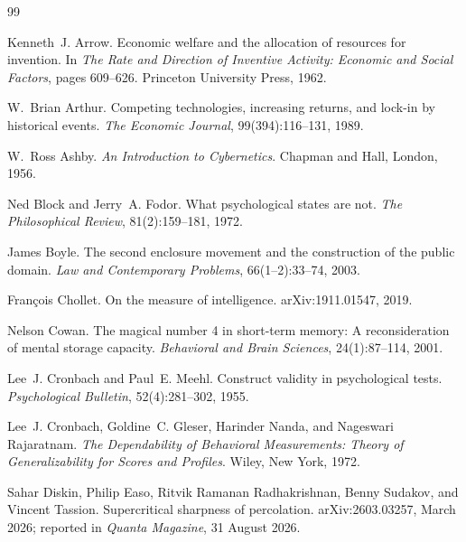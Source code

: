 \documentclass[11pt,a4paper]{article}
\theoremstyle{remark}
\begin{document}
\begin{thebibliography}{99}

Kenneth~J. Arrow.
\newblock Economic welfare and the allocation of resources for invention.
\newblock In \emph{The Rate and Direction of Inventive Activity: Economic and Social Factors}, pages 609--626. Princeton University Press, 1962.

W.~Brian Arthur.
\newblock Competing technologies, increasing returns, and lock-in by historical events.
\newblock \emph{The Economic Journal}, 99(394):116--131, 1989.

W.~Ross Ashby.
\newblock \emph{An Introduction to Cybernetics}.
\newblock Chapman and Hall, London, 1956.

Ned Block and Jerry~A. Fodor.
\newblock What psychological states are not.
\newblock \emph{The Philosophical Review}, 81(2):159--181, 1972.

James Boyle.
\newblock The second enclosure movement and the construction of the public domain.
\newblock \emph{Law and Contemporary Problems}, 66(1--2):33--74, 2003.

Fran\c{c}ois Chollet.
\newblock On the measure of intelligence.
\newblock arXiv:1911.01547, 2019.

Nelson Cowan.
\newblock The magical number 4 in short-term memory: A reconsideration of mental storage capacity.
\newblock \emph{Behavioral and Brain Sciences}, 24(1):87--114, 2001.

Lee~J. Cronbach and Paul~E. Meehl.
\newblock Construct validity in psychological tests.
\newblock \emph{Psychological Bulletin}, 52(4):281--302, 1955.

Lee~J. Cronbach, Goldine~C. Gleser, Harinder Nanda, and Nageswari Rajaratnam.
\newblock \emph{The Dependability of Behavioral Measurements: Theory of Generalizability for Scores
and Profiles}.
\newblock Wiley, New York, 1972.

Sahar Diskin, Philip Easo, Ritvik Ramanan Radhakrishnan, Benny Sudakov, and Vincent Tassion.
\newblock Supercritical sharpness of percolation.
\newblock arXiv:2603.03257, March 2026; reported in \emph{Quanta Magazine}, 31 August 2026.


\end{thebibliography}
\end{document}

